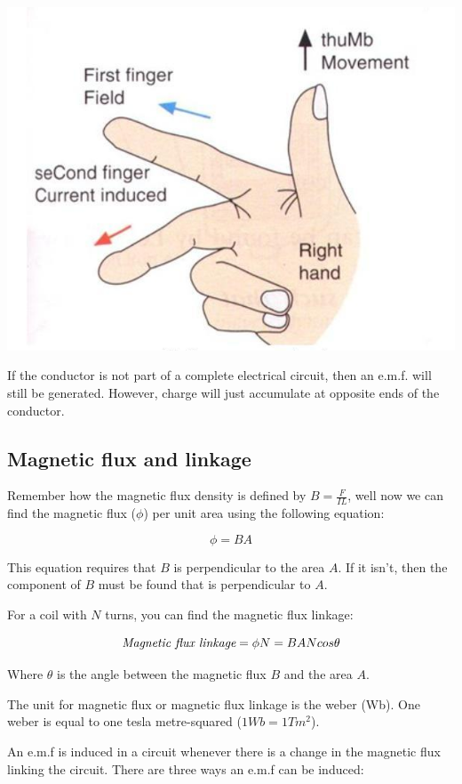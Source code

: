 \documentclass{article}
\begin{document}
\begin{center}
	\includegraphics[scale=0.6]{fleming_right_hand_dynamo_rule}
\end{center}

If the conductor is not part of a complete electrical circuit, then an e.m.f.
will still be generated. However, charge will just accumulate at opposite ends
of the conductor.

\subsection*{Magnetic flux and linkage}

Remember how the magnetic flux density is defined by $B = \frac{F}{IL}$, well
now we can find the magnetic flux ($\phi$) per unit area using the following
equation:

\[
	\phi = BA
\]

This equation requires that $B$ is perpendicular to the area $A$. If it isn't,
then the component of $B$ must be found that is perpendicular to $A$.

For a coil with $N$ turns, you can find the magnetic flux linkage:

\[
	\textrm{\it Magnetic flux linkage} = \phi N = BANcos\theta
\]

Where $\theta$ is the angle between the magnetic flux $B$ and the area $A$.

The unit for magnetic flux or magnetic flux linkage is the weber (Wb). One weber
is equal to one tesla metre-squared ($1Wb=1Tm^2$).

An e.m.f is induced in a circuit whenever there is a change in the magnetic flux
linking the circuit. There are three ways an e.m.f can be induced:
\end{document}
